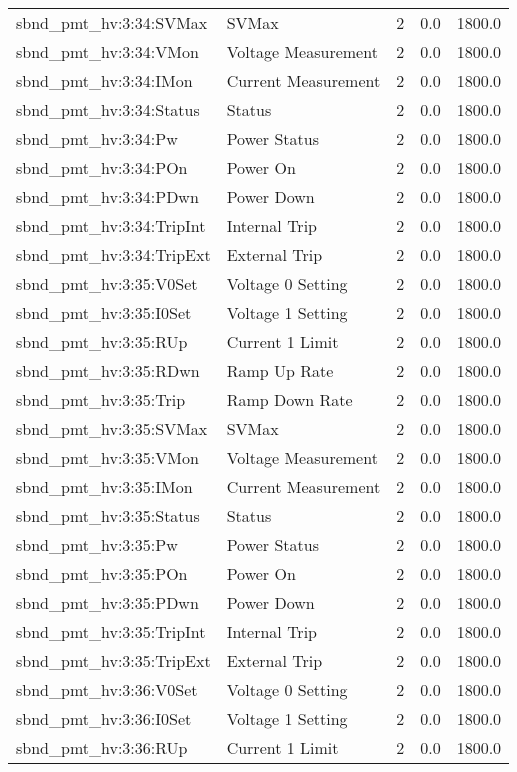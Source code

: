 \begin{center}
\begin{longtable}{l | l l l l }
sbnd\_pmt\_hv:3:34:SVMax & SVMax & 2 & 0.0 & 1800.0\\ 
sbnd\_pmt\_hv:3:34:VMon & Voltage Measurement & 2 & 0.0 & 1800.0\\ 
sbnd\_pmt\_hv:3:34:IMon & Current Measurement & 2 & 0.0 & 1800.0\\ 
sbnd\_pmt\_hv:3:34:Status & Status & 2 & 0.0 & 1800.0\\ 
sbnd\_pmt\_hv:3:34:Pw & Power Status & 2 & 0.0 & 1800.0\\ 
sbnd\_pmt\_hv:3:34:POn & Power On & 2 & 0.0 & 1800.0\\ 
sbnd\_pmt\_hv:3:34:PDwn & Power Down & 2 & 0.0 & 1800.0\\ 
sbnd\_pmt\_hv:3:34:TripInt & Internal Trip & 2 & 0.0 & 1800.0\\ 
sbnd\_pmt\_hv:3:34:TripExt & External Trip & 2 & 0.0 & 1800.0\\ 
sbnd\_pmt\_hv:3:35:V0Set & Voltage 0 Setting & 2 & 0.0 & 1800.0\\ 
sbnd\_pmt\_hv:3:35:I0Set & Voltage 1 Setting & 2 & 0.0 & 1800.0\\ 
sbnd\_pmt\_hv:3:35:RUp & Current 1 Limit & 2 & 0.0 & 1800.0\\ 
sbnd\_pmt\_hv:3:35:RDwn & Ramp Up Rate & 2 & 0.0 & 1800.0\\ 
sbnd\_pmt\_hv:3:35:Trip & Ramp Down Rate & 2 & 0.0 & 1800.0\\ 
sbnd\_pmt\_hv:3:35:SVMax & SVMax & 2 & 0.0 & 1800.0\\ 
sbnd\_pmt\_hv:3:35:VMon & Voltage Measurement & 2 & 0.0 & 1800.0\\ 
sbnd\_pmt\_hv:3:35:IMon & Current Measurement & 2 & 0.0 & 1800.0\\ 
sbnd\_pmt\_hv:3:35:Status & Status & 2 & 0.0 & 1800.0\\ 
sbnd\_pmt\_hv:3:35:Pw & Power Status & 2 & 0.0 & 1800.0\\ 
sbnd\_pmt\_hv:3:35:POn & Power On & 2 & 0.0 & 1800.0\\ 
sbnd\_pmt\_hv:3:35:PDwn & Power Down & 2 & 0.0 & 1800.0\\ 
sbnd\_pmt\_hv:3:35:TripInt & Internal Trip & 2 & 0.0 & 1800.0\\ 
sbnd\_pmt\_hv:3:35:TripExt & External Trip & 2 & 0.0 & 1800.0\\ 
sbnd\_pmt\_hv:3:36:V0Set & Voltage 0 Setting & 2 & 0.0 & 1800.0\\ 
sbnd\_pmt\_hv:3:36:I0Set & Voltage 1 Setting & 2 & 0.0 & 1800.0\\ 
sbnd\_pmt\_hv:3:36:RUp & Current 1 Limit & 2 & 0.0 & 1800.0\\ 

\end{longtable}
\end{center}
